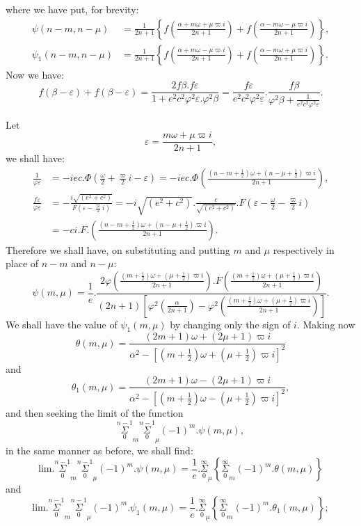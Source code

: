 \documentclass{article}
\begin{document}
where we have put, for brevity:
\[ \begin{aligned}\psi(n-m,n-\mu)&=\frac{1}{2n+1}\left\{f\left(\frac{\alpha+m\omega+\mu\varpi i}{2n+1}\right)+f\left(\frac{\alpha-m\omega-\mu\varpi i}{2n+1}\right)\right\},\\ \psi_{1}(n-m,n-\mu)&=\frac{1}{2n+1}\left\{f\left(\frac{\alpha+m\omega-\mu\varpi i}{2n+1}\right)+f\left(\frac{\alpha-m\omega+\mu\varpi i}{2n+1}\right)\right\}.\end{aligned} \]
Now we have:
\[ f(\beta-\varepsilon)+f(\beta-\varepsilon)=\frac{2f\beta.f\varepsilon}{1+e^{2}c^{2}\varphi^{2}\varepsilon.\varphi^{2}\beta}=\frac{f\varepsilon}{e^{2}c^{2}\varphi^{2}\varepsilon}.\frac{f\beta}{\varphi^{2}\beta+\frac{1}{e^{2}c^{2}\varphi^{2}\varepsilon}}. \]

Let
\[ \varepsilon=\frac{m\omega+\mu\varpi i}{2n+1}, \]
we shall have:
\[ \begin{aligned}\frac{1}{\varphi\varepsilon}&=-iec.\Phi\left(\frac{\omega}{2}+\frac{\varpi}{2}i-\varepsilon\right)=-iec.\Phi\left(\frac{(n-m+\tfrac{1}{2})\omega+(n-\mu+\tfrac{1}{2})\varpi i}{2n+1}\right),\\ \frac{f\varepsilon}{\varphi\varepsilon}&=-\frac{i\sqrt{(e^{2}+c^{2})}}{F\left(\varepsilon-\frac{\varpi}{2}i\right)}=-i\sqrt{(e^{2}+c^{2})}.\frac{c}{\sqrt{(e^{2}+c^{2})}}.F\left(\varepsilon-\frac{\omega}{2}-\frac{\varpi}{2}i\right)\\ &=-ci.F.\left(\frac{(n-m+\tfrac{1}{2})\omega+(n-\mu+\tfrac{1}{2})\varpi i}{2n+1}\right).\end{aligned} \]
Therefore we shall have, on substituting and putting $m$ and $\mu$ respectively in place of $n-m$ and $n-\mu$:
\[ \psi(m,\mu)=\frac{1}{e}.\frac{2\varphi\left(\frac{(m+\tfrac{1}{2})\omega+(\mu+\tfrac{1}{2})\varpi i}{2n+1}\right).F\left(\frac{(m+\tfrac{1}{2})\omega+(\mu+\tfrac{1}{2})\varpi i}{2n+1}\right)}{(2n+1)\left[\varphi^{2}\left(\frac{\alpha}{2n+1}\right)-\varphi^{2}\left(\frac{(m+\tfrac{1}{2})\omega+(\mu+\tfrac{1}{2})\varpi i}{2n+1}\right)\right]}. \]
We shall have the value of $\psi_{1}(m,\mu)$ by changing only the sign of $i$. Making now
\[ \theta(m,\mu)=\frac{(2m+1)\omega+(2\mu+1)\varpi i}{\alpha^{2}-[(m+\tfrac{1}{2})\omega+(\mu+\tfrac{1}{2})\varpi i]^{2}} \]
and
\[ \theta_{1}(m,\mu)=\frac{(2m+1)\omega-(2\mu+1)\varpi i}{\alpha^{2}-[(m+\tfrac{1}{2})\omega-(\mu+\tfrac{1}{2})\varpi i]^{2}}, \]
and then seeking the limit of the function
\[ \overset{n-1}{\underset{0}{\Sigma}}_{m}\overset{n-1}{\underset{0}{\Sigma}}_{\mu}(-1)^{m}.\psi(m,\mu), \]
in the same manner as before, we shall find:
\[ \text{lim.}\overset{n-1}{\underset{0}{\Sigma}}_{m}\overset{n-1}{\underset{0}{\Sigma}}_{\mu}(-1)^{m}.\psi(m,\mu)=\frac{1}{e}.\overset{\infty}{\underset{0}{\Sigma}}_{\mu}\left\{\overset{\infty}{\underset{0}{\Sigma}}_{m}(-1)^{m}.\theta(m,\mu)\right\} \]
and
\[ \text{lim.}\overset{n-1}{\underset{0}{\Sigma}}_{m}\overset{n-1}{\underset{0}{\Sigma}}_{\mu}(-1)^{m}.\psi_{1}(m,\mu)=\frac{1}{e}.\overset{\infty}{\underset{0}{\Sigma}}_{\mu}\left\{\overset{\infty}{\underset{0}{\Sigma}}_{m}(-1)^{m}.\theta_{1}(m,\mu)\right\}; \]
\end{document}
